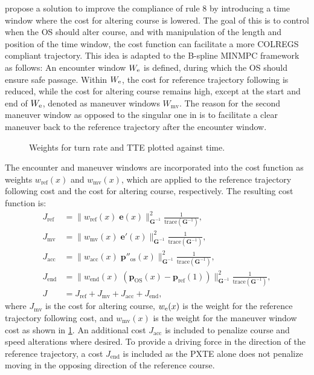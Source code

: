\cite{Thyri2022-MPC} propose a solution to improve the compliance of rule 8 by introducing a time window where the cost for altering course is lowered. The goal of this is to control when the OS should alter course, and with manipulation of the length and position of the time window, the cost function can facilitate a more COLREGS compliant trajectory. This idea is adapted to the B-spline MINMPC framework as follows:
An encounter window $W_\text e$ is defined, during which the OS should ensure safe passage. Within $W_\text e$, the cost for reference trajectory following is reduced, while the cost for altering course remains high, except at the start and end of $W_\text e$, denoted as maneuver windows $W_\text{mv}$. 
The reason for the second maneuver window as opposed to the singular one in \cite{Thyri2022-MPC} is to facilitate a clear maneuver back to the reference trajectory after the encounter window.

\begin{figure}
    \centering
    
    \caption{Weights for turn rate and TTE plotted against time.}
    \label{fig:maneuver-window}
\end{figure}

The encounter and maneuver windows are incorporated into the cost function as weights $w_\text{ref}(x)$ and $w_\text{mv}(x)$, which are applied to the reference trajectory following cost and the cost for altering course, respectively. The resulting cost function is:
\begin{subequations}\label{eq:cost-maneuver-window}
    \begin{align}
        J_\text{ref} &= \|w_\text{ref}(x)\;\mathbf e(x)\|_{\mathbf G^{-1}}^2 \frac{1}{\text{trace}(\mathbf G^{-1})}, 
        \label{eq:cost-maneuver-window-ref}\\
        J_\text{mv} &= \|w_\text{mv}(x)\;\mathbf e'(x)\|_{\mathbf G^{-1}}^2 \frac{1}{\text{trace}(\mathbf G^{-1})},
        \label{eq:cost-maneuver-window-mv}\\
        J_\mathrm{acc} &= \|w_\text{acc}(x)\;\mathbf p''_\text{os}(x)\|_{\mathbf G^{-1}}^2 \frac{1}{\text{trace}(\mathbf G^{-1})}, \label{eq:cost-maneuver-window-acc}\\
        J_\mathrm{end} &= \|w_\text{end}(x)\;(\mathbf p_\text{OS}(x)-\mathbf p_\text{ref}(1))\|_{\mathbf G^{-1}}^2 \frac{1}{\text{trace}(\mathbf G^{-1})}, \label{eq:cost-maneuver-window-end}\\
        J &= J_\text{ref} + J_\text{mv} + J_\mathrm{acc} + J_\mathrm{end},
        \label{eq:cost-maneuver-window-total}
    \end{align}
\end{subequations}
where $J_\text{mv}$ is the cost for altering course, $w_\text e(x)$ is the weight for the reference trajectory following cost, and $w_\text{mv}(x)$ is the weight for the maneuver window cost as shown in \cref{fig:maneuver-window}. An additional cost $J_\mathrm{acc}$ is included to penalize course and speed alterations where desired. To provide a driving force in the direction of the reference trajectory, a cost $J_\mathrm{end}$ is included as the PXTE alone does not penalize moving in the opposing direction of the reference course. 

